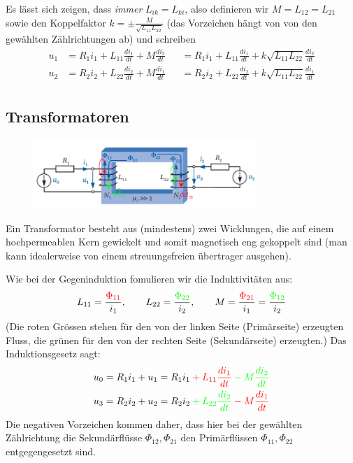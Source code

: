 Es lässt sich zeigen, dass \textit{immer} $L_{ik} = L_{ki}$, also definieren wir $M=L_{12}=L_{21}$ sowie den Koppelfaktor
$k =  \pm\frac{M}{\sqrt{L_{11}L_{22}}}$ (das Vorzeichen hängt von von den gewählten Zählrichtungen ab) und schreiben
\begin{equation*}
\begin{alignedat}{2}
u_1 &= R_1i_1 + L_{11}\frac{di_1}{dt}+M\frac{di_2}{dt} &&= R_1i_1 + L_{11}\frac{di_1}{dt}+k\sqrt{L_{11}L_{22}}\frac{di_2}{dt} \\
u_2 &= R_2i_2 + L_{22}\frac{di_2}{dt}+M\frac{di_1}{dt} &&= R_2i_2 + L_{22}\frac{di_2}{dt}+k\sqrt{L_{11}L_{22}}\frac{di_1}{dt}\\
\end{alignedat}
\end{equation*}
\pagebreak

\subsection{Transformatoren}
\begin{figure}[H]
\center
\vspace{-0.5cm}
\includegraphics[width=0.75\textwidth]{img/Tra2}
\vspace{-0.2cm}
\end{figure}
Ein Transformator besteht aus (mindestens) zwei Wicklungen, die auf einem hochpermeablen Kern gewickelt und somit magnetisch eng gekoppelt sind (man kann idealerweise von einem streuungsfreien übertrager ausgehen). \newline

Wie bei der Gegeninduktion fomulieren wir die Induktivitäten aus:
$$ L_{11} = \frac{\color{red}\Phi_{11}}{i_1}, \qquad L_{22}= \frac{\color{green}\Phi_{22}}{i_2}, \qquad
M = \frac{\color{red}\Phi_{21}}{i_1}=\frac{\color{green}\Phi_{12}}{i_2}$$
(Die roten Grössen stehen für den von der linken Seite (Primärseite) erzeugten Fluss, die grünen für den von der rechten Seite (Sekundärseite) erzeugten.) Das Induktionsgesetz sagt:
 \begin{equation*}
\begin{alignedat}{2}
u_0 &= R_1i_1 + u_1 &&= R_1i_1 \color{red} + L_{11}\frac{di_1}{dt} \color{green} - M\frac{di_2}{dt} \\
u_3 &= R_2i_2 + u_2 &&= R_2i_2 \color{green} + L_{22}\frac{di_2}{dt} \color{red}-M\frac{di_1}{dt}\\
\end{alignedat}
\end{equation*}
Die negativen Vorzeichen kommen daher, dass hier bei der gewählten Zählrichtung die Sekundärflüsse $\Phi_{12},\Phi_{21}$ den Primärflüssen $\Phi_{11},\Phi_{22}$ entgegengesetzt sind. \newline


